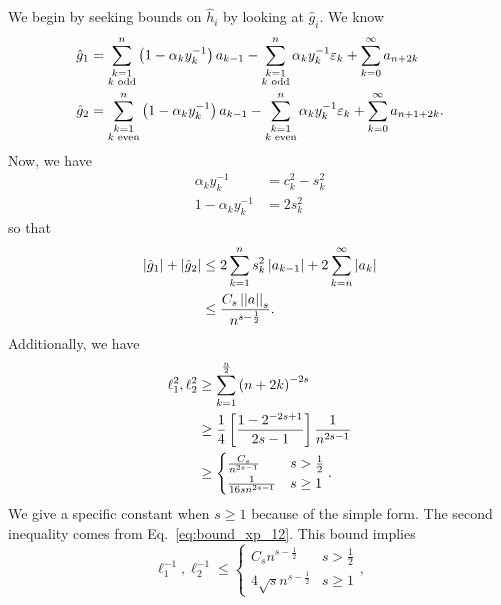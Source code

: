 We begin by seeking bounds on $\hat{h}_{i}$ by looking at $\hat{g}_{i}$.
We know
%
\begin{align}
    \hat{g}_{1} &= \sum_{\substack{k=1\\ k\text{ odd}}}^{n}
        \left( 1-\alpha_{k}y_{k}^{-1} \right)a_{k-1} -
        \sum_{\substack{k=1\\ k\text{ odd}}}^{n}
        \alpha_{k}y_{k}^{-1}\varepsilon_{k} + \sum_{k=0}^{\infty} a_{n+2k}
            \nonumber\\
    \hat{g}_{2} &= \sum_{\substack{k=1\\ k\text{ even}}}^{n}
        \left( 1-\alpha_{k}y_{k}^{-1} \right)a_{k-1} -
        \sum_{\substack{k=1\\ k\text{ even}}}^{n}
        \alpha_{k}y_{k}^{-1}\varepsilon_{k} + \sum_{k=0}^{\infty} a_{n+1+2k}.
\end{align}
%
Now, we have
%
\begin{align}
    \alpha_{k}y_{k}^{-1} &= c_{k}^{2}-s_{k}^{2} \nonumber\\
    1 - \alpha_{k}y_{k}^{-1} &= 2s_{k}^{2}
\end{align}
%
so that
%
\begin{align}
    \left| \hat{g}_{1} \right| + \left| \hat{g}_{2} \right|
        &\le 2\sum_{k=1}^{n}s_{k}^{2}\left| a_{k-1} \right|
            + 2\sum_{k=n}^{\infty} \left| a_{k} \right| \nonumber\\
    &\le \frac{C_{s}\left| \left| a \right| \right|_{s}}{n^{s-\frac{1}{2}}}.
    \label{eq:cvip_1D_bdy_g_hat_sum_bound}
\end{align}
%
Additionally, we have
%
\begin{align}
    \ell_{1}^{2}, \ell_{2}^{2} &\ge \sum_{k=1}^{\frac{n}{2}} \left( n+2k \right)^{-2s}
        \nonumber\\
    &\ge \frac{1}{4}\left[ \frac{1-2^{-2s+1}}{2s-1} \right]\frac{1}{n^{2s-1}}
        \nonumber\\
    &\ge \begin{cases}
                \frac{C_{s}}{n^{2s-1}} &s>\frac{1}{2} \\
                \frac{1}{16sn^{2s-1}} &s\ge1 \\
        \end{cases}.
    \label{eq:cvip_1D_bdy_ell_sum_bound}
\end{align}
%
We give a specific constant when $s\ge1$ because of the simple form.
The second inequality comes from Eq.~\eqref{eq:bound_xp_12}.
This bound implies
%
\begin{equation}
    \ell_{1}^{-1},\ell_{2}^{-1} \le 
        \begin{cases}
            C_{s}n^{s-\frac{1}{2}} &s>\frac{1}{2} \\
            4\sqrt{s}n^{s-\frac{1}{2}} &s\ge1
        \end{cases},
\end{equation}
